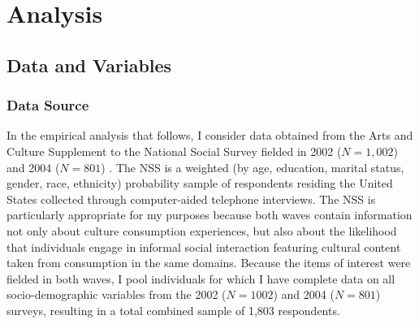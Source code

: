 \section{Analysis}
\label{sec:analysis}

\subsection{Data and Variables}
\label{subsec:data}

\subsubsection{Data Source}

In the empirical analysis that follows, I consider data obtained from the Arts and Culture Supplement to the National Social Survey fielded in 2002 ($N=1,002$) and 2004 ($N=801$) \citep{NSS2002, NSS2004}.  The NSS is a weighted (by age, education, marital status, gender, race, ethnicity) probability sample of respondents residing the United States collected through computer-aided telephone interviews.   The NSS is particularly appropriate for my purposes because both waves contain information not only about culture consumption experiences, but also about the likelihood that individuals engage in informal social interaction featuring cultural content taken from consumption in the same domains.  Because the items of interest were fielded in both waves, I pool individuals for which I have complete data on all socio-demographic variables from the 2002 ($N=1002$) and 2004 ($N=801$) surveys, resulting in a total combined sample of 1,803 respondents.

